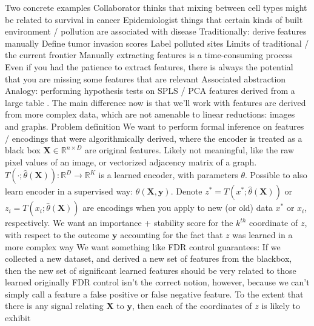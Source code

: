\documentclass[11pt]{article}
\begin{document}
\begin{outline}
\1 Two concrete examples
  \2 Collaborator thinks that mixing between cell types might be related to
  survival in cancer
  \2 Epidemiologist things that certain kinds of built environment / pollution
  are associated with disease
  \2 Traditionally: derive features manually
    \3 Define tumor invasion scores
    \3 Label polluted sites
  \2 Limits of traditional / the current frontier
    \3 Manually extracting features is a time-consuming process
    \3 Even if you had the patience to extract features, there is always the
    potential that you are missing some features that are relevant
\1 Associated abstraction
  \2 Analogy: performing hypothesis tests on SPLS / PCA features derived from a
  large table \citep{rao1955estimation, elguero1988confidence}.
    \3 The main difference now is that we'll work with features are derived from
    more complex data, which are not amenable to linear reductions: images and
    graphs.
  \2 Problem definition
    \3 We want to perform formal inference on features / encodings that were
    algorithmically derived, where the encoder is treated as a black box
      \4 $\mathbf{X} \in \mathbb{R}^{n \times D}$ are original features. Likely
      not meaningful, like the raw pixel values of an image, or vectorized
      adjacency matrix of a graph.
      \4 $T\left(\cdot; \hat{\theta}\left(\mathbf{X}\right)\right) :
      \mathbb{R}^{D} \to \mathbb{R}^{K}$ is a learned encoder, with parameters
      $\theta$. Possible to also learn encoder in a supervised way:
      $\theta\left(\mathbf{X}, \mathbf{y}\right)$.
      \4 Denote $z^{\ast} = T\left(x^{\ast};
      \hat{\theta}\left(\mathbf{X}\right)\right)$ or $z_{i} = T\left(x_{i};
      \hat{\theta}\left(\mathbf{X}\right)\right)$ are encodings when you apply
      to new (or old) data $x^\ast$ or $x_{i}$, respectively.
      \4 We want an importance + stability score for the $k^{th}$ coordinate of
      $z$, with respect to the outcome $\mathbf{y}$ accounting for the fact that
      $z$ was learned in a more complex way
    \3 We want something like FDR control guarantees: If we collected a new
    dataset, and derived a new set of features from the blackbox, then the new
    set of significant learned features should be very related to those learned
    originally
      \4 FDR control isn't the correct notion, however, because we can't simply
      call a feature a false positive or false negative feature.
      \4 To the extent that there is any signal relating $\mathbf{X}$ to
      $\mathbf{y}$, then each of the coordinates of $z$ is likely to exhibit

\end{outline}
\end{document}
